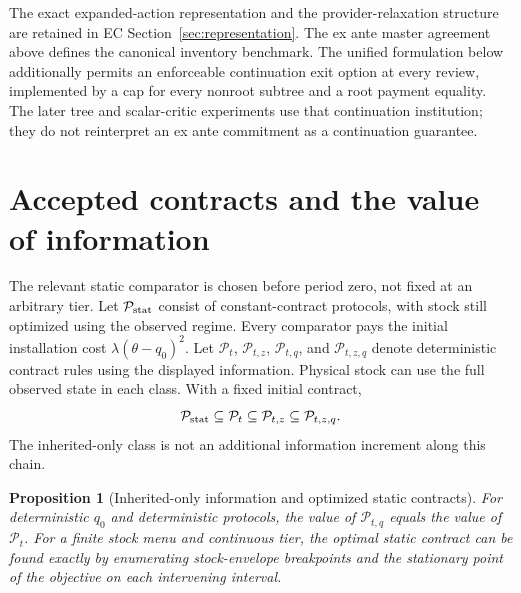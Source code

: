 \documentclass[11pt,letterpaper]{article}
\newtheorem{proposition}[theorem]{Proposition}
\theoremstyle{definition}
\newcommand{\1}{\mathbf 1}
\begin{document}
The exact expanded-action representation and the provider-relaxation structure are retained in EC Section~\ref{sec:representation}. The ex ante master agreement above defines the canonical inventory benchmark. The unified formulation below additionally permits an enforceable continuation exit option at every review, implemented by a cap for every nonroot subtree and a root payment equality. The later tree and scalar-critic experiments use that continuation institution; they do not reinterpret an ex ante commitment as a continuation guarantee.



\section{Accepted contracts and the value of information}\label{sec:accepted}
The relevant static comparator is chosen before period zero, not fixed at an arbitrary tier. Let $\mathcal P_{\rm stat}$ consist of constant-contract protocols, with stock still optimized using the observed regime. Every comparator pays the initial installation cost $\lambda(\theta-q_0)^2$. Let $\mathcal P_t$, $\mathcal P_{t,z}$, $\mathcal P_{t,q}$, and $\mathcal P_{t,z,q}$ denote deterministic contract rules using the displayed information. Physical stock can use the full observed state in each class. With a fixed initial contract,
\begin{equation}\label{eq:classes}
 \mathcal P_{\rm stat}\subseteq\mathcal P_t
 \subseteq\mathcal P_{t,z}\subseteq\mathcal P_{t,z,q}.
\end{equation}
The inherited-only class is not an additional information increment along this chain.
\begin{proposition}[Inherited-only information and optimized static contracts]\label{prop:classes}
For deterministic $q_0$ and deterministic protocols, the value of $\mathcal P_{t,q}$ equals the value of $\mathcal P_t$. For a finite stock menu and continuous tier, the optimal static contract can be found exactly by enumerating stock-envelope breakpoints and the stationary point of the objective on each intervening interval.
\end{proposition}
\end{document}
